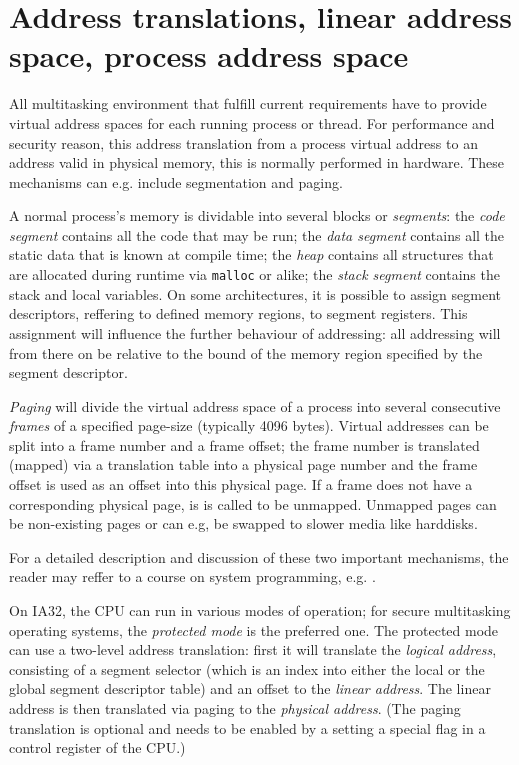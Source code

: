 %
%

\section{Address translations, linear address space, process address space}
\label{address_translation}

All multitasking environment that fulfill current requirements have to provide
virtual address spaces for each running process or thread. For performance and
security reason, this address translation from a process virtual address to an
address valid in physical memory, this is normally performed in hardware.  These
mechanisms can e.g. include segmentation and paging.

A normal process's memory is dividable into several blocks or \emph{segments}:
the \emph{code segment} contains all the code that may be run; the \emph{data
segment} contains all the static data that is known at compile time; the
\emph{heap} contains all structures that are allocated during runtime via
\texttt{malloc} or alike; the \emph{stack segment} contains the stack and local
variables. On some architectures, it is possible to assign segment descriptors,
reffering to defined memory regions, to segment registers. This assignment will
influence the further behaviour of addressing: all addressing will from there on
be relative to the bound of the memory region specified by the segment
descriptor.

\emph{Paging} will divide the virtual address space of a process into several
consecutive \emph{frames} of a specified page-size (typically 4096 bytes).
Virtual addresses can be split into a frame number and a frame offset; the frame
number is translated (mapped) via a translation table into a physical page
number and the frame offset is used as an offset into this physical page. If a
frame does not have a corresponding physical page, is is called to be unmapped.
Unmapped pages can be non-existing pages or can e.g, be swapped to slower media
like harddisks.

For a detailed description and discussion of these two important mechanisms, the
reader may reffer to a course on system programming, e.g.
\cite{rwth_syspro_scriptum:2002}.

On IA32, the CPU can run in various modes of operation; for secure multitasking
operating systems, the \emph{protected mode} is the preferred one. The protected
mode can use a two-level address translation: first it will translate the \emph
{logical address}, consisting of a segment selector (which is an index into
either the local or the global segment descriptor table) and an offset to the
\emph{linear address}.  The linear address is then translated via paging to the
\emph{physical address}. (The paging translation is optional and needs to be
enabled by a setting a special flag in a control register of the CPU.)

